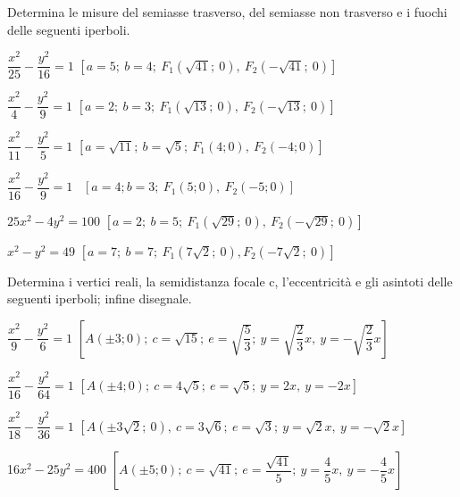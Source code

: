 \subsubsection*{}

\begin{esercizio}
  \label{ese:div.003}
  Determina le misure del semiasse trasverso, del semiasse non 
trasverso e i fuochi delle seguenti iperboli.
  \begin{enumeratea}
  \item \( \dfrac{x^{2}}{25} - \dfrac{y^{2}}{16} =1\)
  \hfill \(\left[a=5;~ b=4;~ F_{1} \left( \sqrt{41} ;~ 0\right), ~ 
F_{2}  \left(- \sqrt{41} ;~0\right)\right]\)
  \item \( \dfrac{x^{2}}{4} - \dfrac{y^{2}}{9} =1\)
  \hfill \(\left[a=2; ~b=3; ~ F_{1} \left( \sqrt{13} ;~ 0\right), ~ 
F_{2}  \left(- \sqrt{13} ;~ 0\right)\right]\)
  \item \( \dfrac{x^{2}}{11} - \dfrac{y^{2}}{5} =1\)
  \hfill \(\left[a= \sqrt{11} ;~ b= \sqrt{5} ;~  F_{1}  (4; 0), ~ 
F_{2}  (-4; 0)\right]\)
  \item \( \dfrac{x^{2}}{16} - \dfrac{y^{2}}{9} =1\)
  \hfill   \
    \(\left[a=4; b=3; ~ F_{1}  (5 ; 0), ~ F_{2}  (-5 ; 0)\right]\)
  \item \( 25x^{2} - 4y^{2} =100\)
  \hfill \(\left[a=2;~ b=5; ~ F_{1} \left( \sqrt{29} ; ~0\right), ~ 
F_{2}  \left(- \sqrt{29} ;~ 0\right)\right]\)
  \item \( x^{2} - y^{2} =49\)
  \hfill \(\left[a=7;~ b=7; ~ F_{1}  \left(7 \sqrt{2} ; ~0\right),  
F_{2}  \left(-7 \sqrt{2} ;~ 0\right)\right]\)
\end{enumeratea}
\end{esercizio}
  
  \begin{esercizio}
    \label{ese:div.003}
    Determina i vertici reali, la semidistanza focale c, 
l'eccentricità e gli asintoti delle seguenti iperboli; infine disegnale.
    \begin{enumeratea}
\item \( \dfrac{x^{2}}{9} - \dfrac{y^{2}}{6} = 1\)
\hfill \(\left[A(\pm 3; 0);~c= \sqrt{15};~e=\sqrt{\dfrac{5}{3}};~y= 
\sqrt{\dfrac{2}{3}} x,~y=- \sqrt{\dfrac{2}{3}} x\right]\)
\item \( \dfrac{x^{2}}{16} - \dfrac{y^{2}}{64} =1\)
\hfill \(\left[A(\pm4; 0);~c=4 \sqrt{5};~e = \sqrt{5};~y=2x,~y=-2x\right]\)
\item \( \dfrac{x^{2}}{18} - \dfrac{y^{2}}{36} = 1\)
\hfill \(\left[A\left(\pm 3 \sqrt{2};~0\right),~c=3 \sqrt{6};~ 
e=\sqrt{3};~y= \sqrt{2}x,~y= -\sqrt{2} x\right]\)
\item 16\( x^{2} -25 y^{2} =400\)
\hfill \(\left[A(\pm5; 0);~c= \sqrt{41};~e= \dfrac{\sqrt{41}}{5};~ y=  
\dfrac{4}{5}x,~y=-\dfrac{4}{5}x \right]\)

\end{enumeratea}
\end{esercizio}

